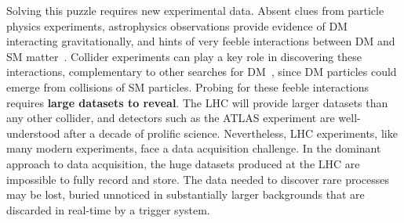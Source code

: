 Solving this puzzle requires new experimental data. 
Absent clues from particle physics experiments, 
astrophysics observations provide evidence of DM interacting gravitationally, and hints of very feeble interactions between DM and SM matter~\cite{Bernal:2017kxu,Steigman:2012nb}. 
Collider experiments can play a key role in discovering these interactions, complementary to other searches for DM~\cite{Boveia:2018yeb}, since DM particles could emerge from collisions of SM particles.
Probing for these feeble interactions requires \textbf{large datasets to reveal}.
The LHC will provide larger datasets than any other collider, and detectors such as the ATLAS experiment are well-understood after a decade of prolific science.
Nevertheless, LHC experiments, like many modern experiments, face a data acquisition challenge.
In the dominant approach to data acquisition, the huge datasets produced at the LHC are impossible to fully record and store.
The data needed to discover rare processes may be lost, buried unnoticed in substantially larger backgrounds that are discarded in real-time by a trigger system.

